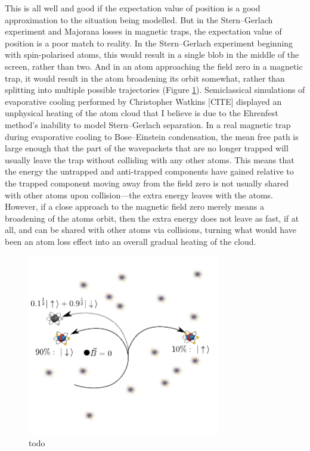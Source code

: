 This is all well and good if the expectation value of position is a good approximation to the situation being modelled. But in the Stern--Gerlach experiment and Majorana losses in magnetic traps, the expectation value of position is a poor match to reality. In the Stern--Gerlach experiment beginning with spin-polarised atoms, this would result in a single blob in the middle of the screen, rather than two. And in an atom approaching the field zero in a magnetic trap, it would result in the atom broadening its orbit somewhat, rather than splitting into multiple possible trajectories (Figure \ref{fig:evap_problem}). Semiclassical simulations of evaporative cooling performed by Christopher Watkins [CITE] displayed an unphysical heating of the atom cloud that I believe is due to the Ehrenfest method's inability to model Stern--Gerlach separation. In a real magnetic trap during evaporative cooling to Bose--Einstein condensation, the mean free path is large enough that the part of the wavepackets that are no longer trapped will usually leave the trap without colliding with any other atoms. This means that the energy the untrapped and anti-trapped components have gained relative to the trapped component moving away from the field zero is not usually shared with other atoms upon collision---the extra energy leaves with the atoms. However, if a close approach to the magnetic field zero merely means a broadening of the atoms orbit, then the extra energy does not leave as fast, if at all, and can be shared with other atoms via collisions, turning what would have been an atom loss effect into an overall gradual heating of the cloud. 

\begin{figure}[t]
    \centerfloat
    \includegraphics[width=0.75\textwidth]{figures/hidden_variables/evap_problem.pdf}
    \caption{todo}
    \label{fig:evap_problem}
\end{figure}

